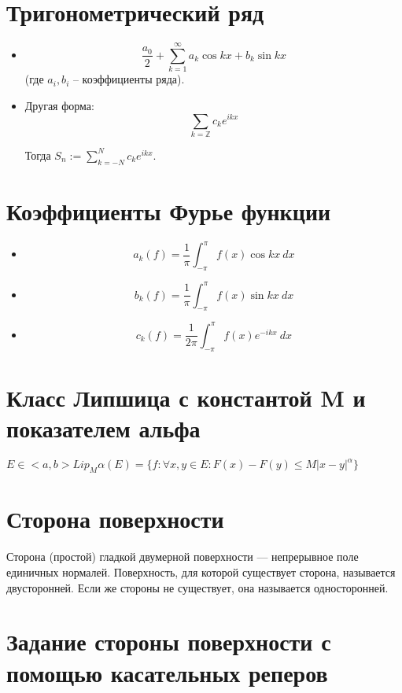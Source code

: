 \documentclass[paper=a4, fontsize=14pt]{report}
\begin{document}
	\section{Тригонометрический ряд}

	\begin{itemize}
		\item $$ \frac{a_0}{2}  + \sum_{k = 1}^{\infty} a_k\cos kx + b_k\sin kx $$
		(где $ a_i, b_i $ -- коэффициенты ряда).

		\item Другая форма:	$$ \sum_{k = \mathbb{Z}} c_k e^{ikx} $$

		Тогда $ S_n := \sum_{k = -N}^{N} c_k e^{ikx} $.
	\end{itemize}

	\section{Коэффициенты Фурье функции}

	\begin{itemize}
		\item $$ a_k(f) = \frac{1}{\pi} \int_{-\pi}^{\pi} f(x) \cos kx ~ dx $$

		\item $$ b_k(f) = \frac{1}{\pi} \int_{-\pi}^{\pi} f(x) \sin kx ~ dx $$

		\item $$ c_k(f) = \frac{1}{2\pi} \int_{-\pi}^{\pi} f(x) e^{-ikx} ~ dx $$

	\end{itemize}

    \section{Класс Липшица с константой M и показателем альфа}
    $E \in <a, b>   Lip_M \alpha(E) = \{f: \forall x,y \in E : F(x) - F(y) \leq M|x-y|^\alpha\}$

	\section{Сторона поверхности}

	Сторона (простой) гладкой двумерной поверхности {{---}} непрерывное поле единичных нормалей. Поверхность, для которой существует сторона, называется двусторонней. Если же стороны не существует, она называется односторонней.


	\section{Задание стороны поверхности с помощью касательных реперов}
\end{document}
